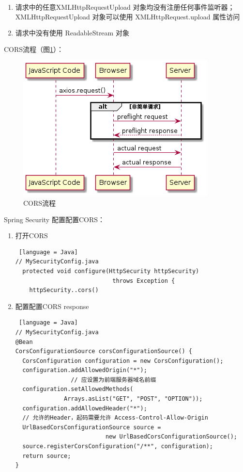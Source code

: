 \begin{enumerate}
\begin{enumerate}
\begin{lstlisting} [language = Java]
            application/x-www-form-urlencoded
    HTML头部header field字段：
                DPR、Download、Save-Data、Viewport-Width、WIdth
              \end{lstlisting}
              \item 请求中的任意XMLHttpRequestUpload 对象均没有注册任何事件监听器；XMLHttpRequestUpload 对象可以使用 XMLHttpRequest.upload 属性访问
              \item 请求中没有使用 ReadableStream 对象
          \end{enumerate}
          CORS流程（图\ref{CORS-flow}）：
          \begin{figure}[h]
              \centering
              \includegraphics[scale = 0.6]{out/uml/时序图/CORS-flow/CORS-flow.png}
              \caption{\song\wuhao CORS流程}
              \label{CORS-flow}
          \end{figure}
          Spring Security 配置配置CORS：
          \begin{enumerate}
              \item 打开CORS \begin{lstlisting} [language = Java]
// MySecurityConfig.java
  protected void configure(HttpSecurity httpSecurity) 
                            throws Exception {
    httpSecurity..cors()
              \end{lstlisting}
              \item 配置配置CORS response
                    \begin{lstlisting} [language = Java]
// MySecurityConfig.java
@Bean
CorsConfigurationSource corsConfigurationSource() {
  CorsConfiguration configuration = new CorsConfiguration();
  configuration.addAllowedOrigin("*"); 
                // 应设置为前端服务器域名前缀
  configuration.setAllowedMethods(
              Arrays.asList("GET", "POST", "OPTION"));
  configuration.addAllowedHeader("*");
  // 允许的Header，起码需要允许 Access-Control-Allow-Origin
  UrlBasedCorsConfigurationSource source = 
                          new UrlBasedCorsConfigurationSource();
  source.registerCorsConfiguration("/**", configuration);
  return source;
}
          \end{lstlisting}
          \end{enumerate}
\end{enumerate}